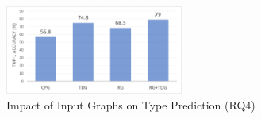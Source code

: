 \begin{figure}[t]%
\begin{center}
\includegraphics[width=2.3in]{figures/sensi-graphs-type-2}
\vspace{-8pt}
\caption{Impact of Input Graphs on Type Prediction (RQ4)}
\label{graph-type-result}
\end{center}
\end{figure}



